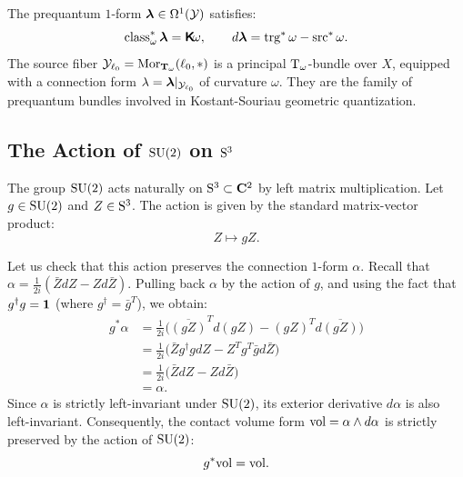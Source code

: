 \documentclass[11pt,reqno,letterpaper,twoside]{amsart}
\renewcommand{\TT}{\Groupoid{T}}
\renewcommand{\Komega}{\CHO\!\omega}
\newcommand{\barZ}{\bar Z}
\begin{document}
  The prequantum $1$-form $\boldsymbol \lambda \in \Omega^1(\mathcal{Y})$ satisfies:
  \[
    \Class_\omega^*\blambda = \Komega,
    \qquad
    d\blambda = \Trg^*\omega - \Src^*\omega.
    \]
  The source fiber $\cY_{\ell_0} = \Mor_{\TT_\omega}(\ell_0, \ast)$ is a principal $\mathrm{T}_\omega$-bundle over $X$,
  equipped with a connection form $\lambda = \boldsymbol \lambda|_{\mathcal{Y}_{\ell_0}}$ of curvature $\omega$.
  They are the family of prequantum bundles involved in Kostant-Souriau geometric quantization.
  
  \subsection{The Action of $\mathrm{SU}(2)$ on $\mathrm{S}^3$}
  
  The group $\mathrm{SU}(2)$ acts naturally on $\mathrm{S}^3 \subset {\mathbf{C}}^2$ by left matrix multiplication.
  Let $g \in \mathrm{SU}(2)$ and $Z \in \mathrm{S}^3$.
  The action is given by the standard matrix-vector product:
  \[
    Z \longmapsto g Z.
    \]
  
  Let us check that this action preserves the connection $1$-form $\alpha$.
  Recall that $\alpha = \frac{1}{2i} ( \barZ dZ - Z d\barZ )$.
  Pulling back $\alpha$ by the action of $g$,
  and using the fact that $g^\dagger g = \boldsymbol{1}$ (where $g^\dagger = \bar{g}^T$),
  we obtain:
  \begin{align*}
    g^*\alpha &= \frac{1}{2i} \bigl( \overline{(gZ)}^T d(gZ) - (gZ)^T d\overline{(gZ)} \bigr) \\
    &= \frac{1}{2i} \bigl( \barZ g^\dagger g dZ - Z^T g^T \bar{g} d\barZ \bigr) \\
    &= \frac{1}{2i} \bigl( \barZ dZ - Z d\barZ \bigr) \\
    &= \alpha.
  \end{align*}
  Since $\alpha$ is strictly left-invariant under $\mathrm{SU}(2)$,
  its exterior derivative $d\alpha$ is also left-invariant.
  Consequently,
  the contact volume form $\mathrm{vol} = \alpha \wedge d\alpha$ is strictly preserved by the action of $\mathrm{SU}(2)$:
  \[
    g^*\mathrm{vol} = \mathrm{vol}.
    \]
  
\end{document}
